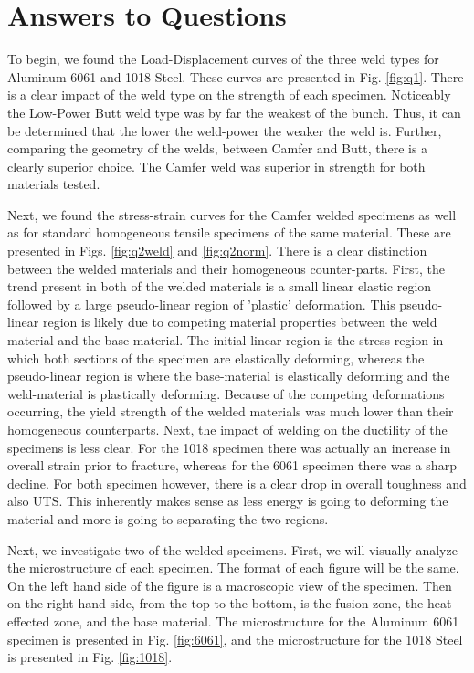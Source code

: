 \documentclass{article}
\begin{document}
\section{Answers to Questions}
To begin, we found the Load-Displacement curves of the three weld types for Aluminum 6061 and 1018 Steel. These curves are presented in Fig. \ref{fig:q1}. There is a clear impact of the weld type on the strength of each specimen. Noticeably the Low-Power Butt weld type was by far the weakest of the bunch. Thus, it can be determined that the lower the weld-power the weaker the weld is. Further, comparing the geometry of the welds, between Camfer and Butt, there is a clearly superior choice. The Camfer weld was superior in strength for both materials tested. 

Next, we found the stress-strain curves for the Camfer welded specimens as well as for standard homogeneous tensile specimens of the same material. These are presented in Figs. \ref{fig:q2weld} and \ref{fig:q2norm}. There is a clear distinction between the welded materials and their homogeneous counter-parts. First, the trend present in both of the welded materials is a small linear elastic region followed by a large pseudo-linear region of 'plastic' deformation. This pseudo-linear region is likely due to competing material properties between the weld material and the base material. The initial linear region is the stress region in which both sections of the specimen are elastically deforming, whereas the pseudo-linear region is where the base-material is elastically deforming and the weld-material is plastically deforming. Because of the competing deformations occurring, the yield strength of the welded materials was much lower than their homogeneous counterparts. Next, the impact of welding on the ductility of the specimens is less clear. For the 1018 specimen there was actually an increase in overall strain prior to fracture, whereas for the 6061 specimen there was a sharp decline. For both specimen however, there is a clear drop in overall toughness and also UTS. This inherently makes sense as less energy is going to deforming the material and more is going to separating the two regions. 

Next, we investigate two of the welded specimens. First, we will visually analyze the microstructure of each specimen. The format of each figure will be the same. On the left hand side of the figure is a macroscopic view of the specimen. Then on the right hand side, from the top to the bottom, is the fusion zone, the heat effected zone, and the base material. The microstructure for the Aluminum 6061 specimen is presented in Fig. \ref{fig:6061}, and the microstructure for the 1018 Steel is presented in Fig. \ref{fig:1018}.
\end{document}

